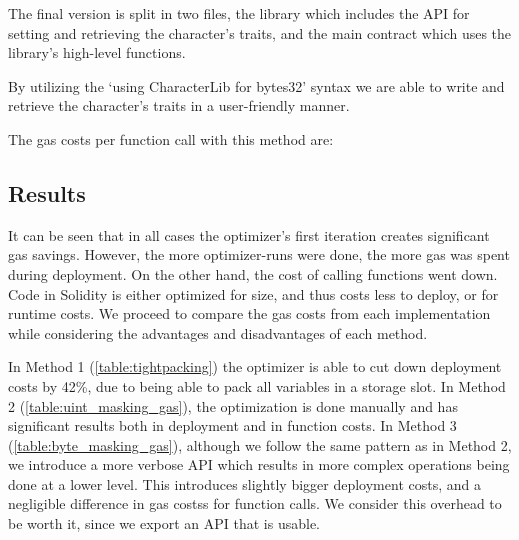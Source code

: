 The final version is split in two files, the library which includes the API for setting and retrieving the character's traits, and the main contract which uses the library's high-level functions.

By utilizing the `using CharacterLib for bytes32' syntax we are able to write and retrieve the character's traits in a user-friendly manner.


The gas costs per function call with this method are: 


\subsection{Results}
It can be seen that in all cases the optimizer's first iteration creates significant gas savings. However, the more optimizer-runs were done, the more gas was spent during deployment. On the other hand, the cost of calling functions went down. Code in Solidity is either optimized for size, and thus costs less to deploy, or for runtime costs\cite{optimizer-tradeoff}. We proceed to compare the gas costs from each implementation while considering the advantages and disadvantages of each method. 

In Method 1 (\ref{table:tightpacking}) the optimizer is able to cut down deployment costs by 42\%, due to being able to pack all variables in a storage slot. In Method 2 (\ref{table:uint_masking_gas}), the optimization is done manually and has significant results both in deployment and in function costs. In Method 3 (\ref{table:byte_masking_gas}), although we follow the same pattern as in Method 2, we introduce a more verbose API which results in more complex operations being done at a lower level. This introduces slightly bigger deployment costs, and a negligible difference in gas costss for function calls. We consider this overhead to be worth it, since we export an API that is usable.  

